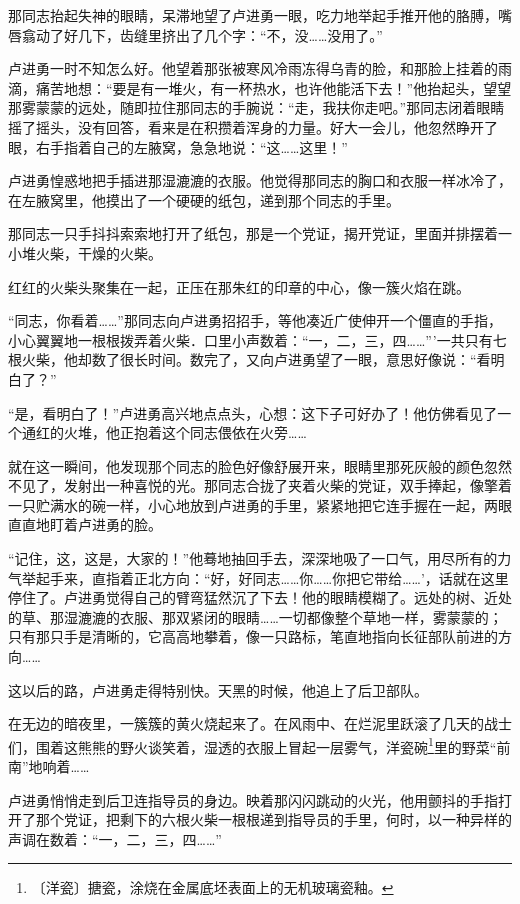 \documentclass[12pt,UTF-8,openany]{ctexbook}
\begin{document}
\begin{large}
    那同志抬起失神的眼睛，呆滞地望了卢进勇一眼，吃力地举起手推开他的胳膊，嘴唇翕动了好几下，齿缝里挤出了几个字：“不，没……没用了。”
    
    卢进勇一时不知怎么好。他望着那张被寒风冷雨冻得乌青的脸，和那脸上挂着的雨滴，痛苦地想：“要是有一堆火，有一杯热水，也许他能活下去！”他抬起头，望望那雾蒙蒙的远处，随即拉住那同志的手腕说：“走，我扶你走吧。”那同志闭着眼睛摇了摇头，没有回答，看来是在积攒着浑身的力量。好大一会儿，他忽然睁开了眼，右手指着自己的左腋窝，急急地说：“这……这里！”
    
    卢进勇惶惑地把手插进那湿漉漉的衣服。他觉得那同志的胸口和衣服一样冰冷了，在左腋窝里，他摸出了一个硬硬的纸包，递到那个同志的手里。
    
    那同志一只手抖抖索索地打开了纸包，那是一个党证，揭开党证，里面并排摆着一小堆火柴，干燥的火柴。
    
    红红的火柴头聚集在一起，正压在那朱红的印章的中心，像一簇火焰在跳。
    
    “同志，你看着……”那同志向卢进勇招招手，等他凑近广使伸开一个僵直的手指，小心翼翼地一根根拨弄着火柴．口里小声数着：“一，二，三，四……”’一共只有七根火柴，他却数了很长时间。数完了，又向卢进勇望了一眼，意思好像说：“看明白了？”
    
    “是，看明白了！”卢进勇高兴地点点头，心想：这下子可好办了！他仿佛看见了一个通红的火堆，他正抱着这个同志偎依在火旁……
    
    就在这一瞬间，他发现那个同志的脸色好像舒展开来，眼睛里那死灰般的颜色忽然不见了，发射出一种喜悦的光。那同志合拢了夹着火柴的党证，双手捧起，像擎着一只贮满水的碗一样，小心地放到卢进勇的手里，紧紧地把它连手握在一起，两眼直直地盯着卢进勇的脸。
    
    “记住，这，这是，大家的！”他蓦地抽回手去，深深地吸了一口气，用尽所有的力气举起手来，直指着正北方向：“好，好同志……你……你把它带给……’，话就在这里停住了。卢进勇觉得自己的臂弯猛然沉了下去！他的眼睛模糊了。远处的树、近处的草、那湿漉漉的衣服、那双紧闭的眼睛……一切都像整个草地一样，雾蒙蒙的；只有那只手是清晰的，它高高地攀着，像一只路标，笔直地指向长征部队前进的方向……
    
    这以后的路，卢进勇走得特别快。天黑的时候，他追上了后卫部队。
    
    在无边的暗夜里，一簇簇的黄火烧起来了。在风雨中、在烂泥里跃滚了几天的战士们，围着这熊熊的野火谈笑着，湿透的衣服上冒起一层雾气，洋瓷碗\footnote{〔洋瓷〕搪瓷，涂烧在金属底坯表面上的无机玻璃瓷釉。}里的野菜“前南”地响着……
    
    卢进勇悄悄走到后卫连指导员的身边。映着那闪闪跳动的火光，他用颤抖的手指打开了那个党证，把剩下的六根火柴一根根递到指导员的手里，何时，以一种异样的声调在数着：“一，二，三，四……”
    
\end{large}
\end{document}
